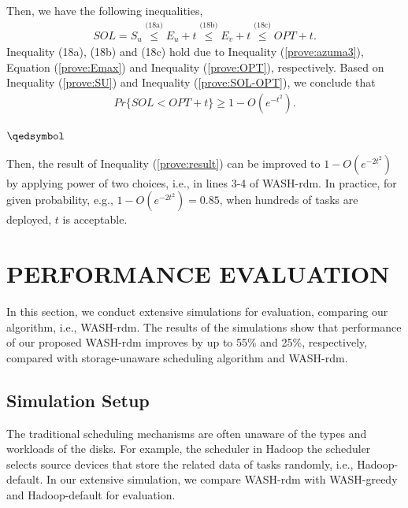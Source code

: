 \documentclass[conference]{IEEEtran}
\begin{document}
\vspace{-0.3cm}
Then, we have the following inequalities,
\vspace{-0.2cm}
\begin{align}
SOL = S_u  
\overset{\text{(18a)}}{\leq} E_u+t
\overset{\text{(18b)}}{\leq} E_v+t
\overset{\text{(18c)}}{\leq} OPT+t.\label{prove:SOL-OPT}
\end{align}
Inequality (18a), (18b) and (18c) hold due to Inequality (\ref{prove:azuma3}), Equation (\ref{prove:Emax}) and Inequality (\ref{prove:OPT}), respectively.  Based on Inequality (\ref{prove:SU}) and Inequality (\ref{prove:SOL-OPT}), we conclude that
\vspace{-0.2cm}
\begin{align}
Pr\{SOL<OPT+t\}\geq 1 - O(e^{-t^2}).\label{prove:result}
\end{align}

\vspace{-0.2cm}
\hfill \;$\qedsymbol$

Then, the result of Inequality (\ref{prove:result}) can be improved to $1 - O(e^{-2t^2})$ by applying power of two choices, i.e., in lines 3-4 of WASH-rdm. In practice, for given probability, e.g., $1 - O(e^{-2t^2}) = 0.85$, when hundreds of tasks are deployed, $t$ is acceptable.

\section{PERFORMANCE EVALUATION}\label{PERFORMANCE_EVALUATION}
In this section, we conduct extensive simulations for evaluation, comparing our algorithm, i.e., WASH-rdm. The results of the simulations show that performance of our proposed WASH-rdm improves by up to 55\% and 25\%, respectively, compared with  storage-unaware scheduling algorithm and  WASH-rdm.
\subsection{Simulation Setup}\label{SCM}
The traditional scheduling mechanisms are often unaware of the types and workloads of the disks. For example, the scheduler in Hadoop the scheduler selects source devices that store the related data of tasks randomly, i.e., Hadoop-default. In our extensive simulation, we compare WASH-rdm with WASH-greedy and Hadoop-default for evaluation.
\end{document}
